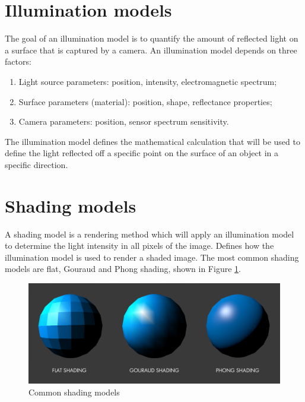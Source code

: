 \section{Illumination models}
The goal of an illumination model is to quantify the amount of reflected light on a surface that is captured by a camera. An illumination model depends on three factors:

\begin{enumerate}
    \item Light source parameters: position, intensity, electromagnetic spectrum;
    \item Surface parameters (material): position, shape, reflectance properties;
    \item Camera parameters: position, sensor spectrum sensitivity.
\end{enumerate}

The illumination model defines the mathematical calculation that will be used to define the light reflected off a specific point on the surface of an object in a specific direction.

\section{Shading models}
A shading model is a rendering method which will apply an illumination model to determine the light intensity in all pixels of the image. Defines how the illumination model is used to render a shaded image. The most common shading models are flat, Gouraud and Phong shading, shown in Figure \ref{fig:shading_models}.

\begin{figure}[h]
    \begin{center}
        \includegraphics[width = 15cm]{figs/shading_models.png}
    \end{center}
    \caption{Common shading models}
    \label{fig:shading_models}
\end{figure}

